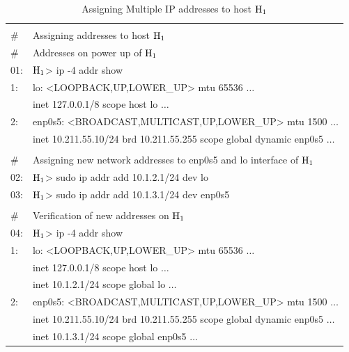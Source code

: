 \begin{table}[H]
\caption{Assigning Multiple IP addresses to host ${\rm H}_{1}$}\label{chap2-table-4}
\begin{center}
\begin{tabular}{|l@{\;}l|}
\hline
   & \\[-.8em] 
\# & Assigning addresses to host ${\rm H}_{1}$\\
\# & Addresses on power up of ${\rm H}_{1}$\\
01:& ${\rm H}_{1}$> ip -4 addr show\\
1: & lo: <LOOPBACK,UP,LOWER\_UP> mtu 65536 $\ldots$\\
   & \quad inet 127.0.0.1/8 scope host lo $\ldots$\\
2: & enp0s5: <BROADCAST,MULTICAST,UP,LOWER\_UP> mtu 1500 $\ldots$\\
   & \quad inet 10.211.55.10/24 brd 10.211.55.255 scope global dynamic enp0s5 $\ldots$\\[.1cm]
   \hline
   & \\[-.8em] 
\# & Assigning new network addresses to enp0s5 and lo interface of ${\rm H}_{1}$\\
02:& ${\rm H}_{1}$> sudo ip addr add 10.1.2.1/24 dev lo\\
03:& ${\rm H}_{1}$> sudo ip addr add 10.1.3.1/24 dev enp0s5\\[.1cm]
\hline
   & \\[-.8em] 
\# & Verification of new addresses on ${\rm H}_{1}$\\
04:& ${\rm H}_{1}$> ip -4 addr show\\
1: & lo: <LOOPBACK,UP,LOWER\_UP> mtu 65536 $\ldots$\\
   &\quad inet 127.0.0.1/8 scope host lo $\ldots$\\
   & \quad inet 10.1.2.1/24 scope global lo $\ldots$\\
2: & enp0s5: <BROADCAST,MULTICAST,UP,LOWER\_UP> mtu 1500 $\ldots$\\
   & \quad inet 10.211.55.10/24 brd 10.211.55.255 scope global dynamic enp0s5 $\ldots$\\
   &\quad inet 10.1.3.1/24 scope global enp0s5 $\ldots$\\[.1cm]
   \hline   
\end{tabular}
\end{center}
\end{table}

\vspace{-1cm}

